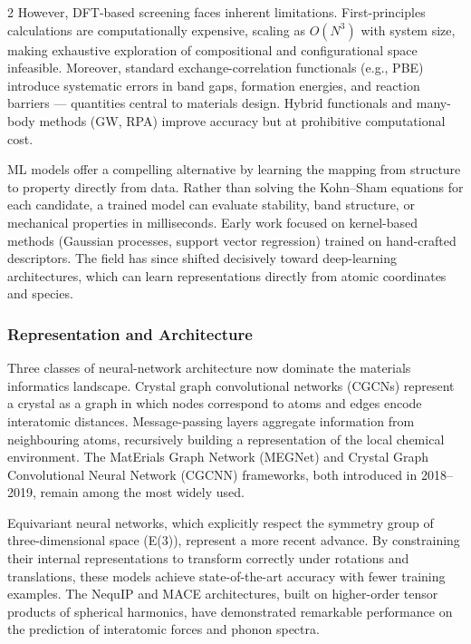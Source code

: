 \documentclass[a4paper,11pt]{article}
\begin{document}
\begin{multicols}{2}
\medskip
However, DFT-based screening faces inherent limitations. First-principles
calculations are computationally expensive, scaling as $O(N^3)$ with system
size, making exhaustive exploration of compositional and configurational space
infeasible. Moreover, standard exchange-correlation functionals (e.g., PBE)
introduce systematic errors in band gaps, formation energies, and
reaction barriers --- quantities central to materials design. Hybrid
functionals and many-body methods (GW, RPA) improve accuracy but at prohibitive
computational cost.

\medskip
ML models offer a compelling alternative by learning the mapping from structure
to property directly from data. Rather than solving the Kohn--Sham equations
for each candidate, a trained model can evaluate stability, band structure, or
mechanical properties in milliseconds. Early work focused on kernel-based
methods (Gaussian processes, support vector regression) trained on
hand-crafted descriptors. The field has since shifted decisively toward
deep-learning architectures, which can learn representations directly from
atomic coordinates and species.

\subsubsection{Representation and Architecture}

Three classes of neural-network architecture now dominate the materials
informatics landscape. Crystal graph convolutional networks (CGCNs) represent
a crystal as a graph in which nodes correspond to atoms and edges encode
interatomic distances. Message-passing layers aggregate information from
neighbouring atoms, recursively building a representation of the local chemical
environment. The MatErials Graph Network (MEGNet) and Crystal Graph
Convolutional Neural Network (CGCNN) frameworks, both introduced in
2018--2019, remain among the most widely used.

\medskip
Equivariant neural networks, which explicitly respect the symmetry group of
three-dimensional space (E(3)), represent a more recent advance. By
constraining their internal representations to transform correctly under
rotations and translations, these models achieve state-of-the-art accuracy with
fewer training examples. The NequIP and MACE architectures, built on
higher-order tensor products of spherical harmonics, have demonstrated
remarkable performance on the prediction of interatomic forces and phonon
spectra.


\end{multicols}
\end{document}
